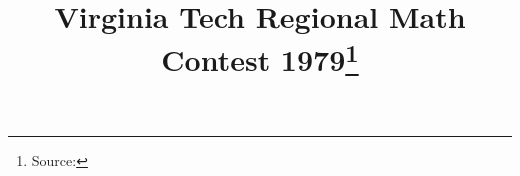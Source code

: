 \documentclass[10pt]{article}
\begin{document}
\title{Virginia Tech Regional Math Contest 1979\footnote{Source: \source}}
\author{\vspace{-2ex}}
\date{\vspace{-6ex}} %
\maketitle








\end{document}

